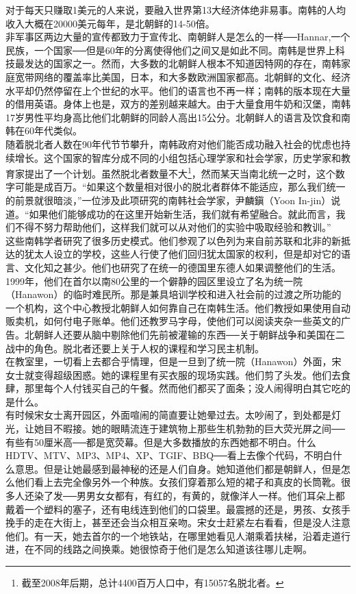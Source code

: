 对于每天只赚取1美元的人来说，要融入世界第13大经济体绝非易事。南韩的人均收入大概在20000美元每年，是北朝鲜的14-50倍。\\

非军事区两边大量的宣传都致力于宣传北、南朝鲜人是怎么的一样──Hannar,一个民族，一个国家──但是60年的分离使得他们之间又是如此不同。南韩是世界上科技最发达的国家之一。然而，大多数的北朝鲜人根本不知道因特网的存在，南韩家庭宽带网络的覆盖率比美国，日本，和大多数欧洲国家都高。北朝鲜的文化、经济水平却仍然停留在上个世纪的水平。他们的语言也不再一样；南韩的版本现在大量的借用英语。身体上也是，双方的差别越来越大。由于大量食用牛奶和汉堡，南韩17岁男性平均身高比他们北朝鲜的同龄人高出15公分。北朝鲜人的语言及饮食和南韩在60年代类似。\\

随着脱北者人数在90年代节节攀升，南韩政府对他们能否成功融入社会的忧虑也持续增长。这个国家的智库分成不同的小组包括心理学家和社会学家，历史学家和教育家提出了一个计划。虽然脱北者数量不大\footnote{截至2008年后期，总计4400百万人口中，有15057名脱北者。}，然而某天当南北统一之时，这个数字可能是成百万。“如果这个数量相对很小的脱北者群体不能适应，那么我们统一的前景就很暗淡，”一位涉及此项研究的南韩社会学家，尹麟鎭（Yoon In-jin）说道。“如果他们能够成功的在这里开始新生活，我们就有希望融合。就此而言，我们不得不努力帮助他们，这样我们就可以从对他们的实验中吸取经验和教训。”\\

这些南韩学者研究了很多历史模式。他们参观了以色列为来自前苏联和北非的新抵达的犹太人设立的学校，这些人行使了他们回归犹太国家的权利，但是却对它的语言、文化知之甚少。他们也研究了在统一的德国里东德人如果调整他们的生活。\\

1999年，他们在首尔以南80公里的一个僻静的园区里设立了名为统一院（Hanawon）的临时难民所。那是兼具培训学校和进入社会前的过渡之所功能的一个机构，这个中心教授北朝鲜人如何靠自己在南韩生活。他们教授如果使用自动贩卖机，如何付电子账单。他们还教罗马字母，使他们可以阅读夹杂一些英文的广告。北朝鲜人还要从脑中剔除他们先前被灌输的东西──关于朝鲜战争和美国在二战中的角色。脱北者还要上关于人权的课程和学习民主机制。\\

在教室里，一切看上去都合乎情理，但是一旦到了统一院（Hanawon）外面，宋女士就变得超级困惑。她的课程里有买衣服的现场实践。他们剪了头发。他们去食肆，那里每个人付钱买自己的午餐。然而他们都买了面条；没人闹得明白其它吃的是什么。\\

有时候宋女士离开园区，外面喧闹的简直要让她晕过去。太吵闹了，到处都是灯光，让她目不暇接。她的眼睛流连于建筑物上那些生机勃勃的巨大荧光屏之间──有些有50厘米高──都是宽荧幕。但是大多数播放的东西她都不明白。什么HDTV、MTV、MP3、MP4、XP、TGIF、BBQ──看上去像个代码，不明白什么意思。但是让她最感到最神秘的还是人们自身。她知道他们都是朝鲜人，但是怎么他们看上去完全像另外一个种族。女孩们穿着那么短的裙子和真皮的长筒靴。很多人还染了发──男男女女都有，有红的，有黄的，就像洋人一样。他们耳朵上都戴着一个塑料的塞子，还有电线连到他们的口袋里。最震撼的还是，男孩、女孩手挽手的走在大街上，甚至还会当众相互亲吻。宋女士赶紧左右看看，但是没人注意他们。有一天，她去首尔的一个地铁站，在哪里她看见人潮乘着扶梯，沿着走道行进，在不同的线路之间换乘。她很惊奇于他们是怎么知道该往哪儿走啊。\\

